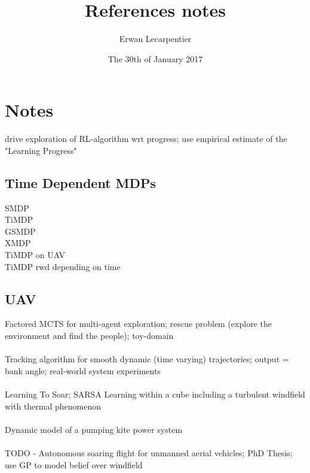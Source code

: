 \documentclass[]{article}
\begin{document}
\title{References notes}
\author{Erwan Lecarpentier}
\date{The 30th of January 2017}


\section*{Notes}

\noindent \cite{lopes2012exploration} drive exploration of RL-algorithm wrt progress; use empirical estimate of the "Learning Progress"

\subsection*{Time Dependent MDPs}
\noindent \cite{sutton1999between} SMDP\\
\noindent \cite{boyan2000exact} TiMDP\\
\noindent \cite{younes2004solving} GSMDP\\
\noindent \cite{rachelson2008extending} XMDP\\
\noindent \cite{rachelson2009adapting} TiMDP on UAV\\
\noindent \cite{bastostime} TiMDP rwd depending on time

\subsection*{UAV}
\noindent \cite{baker2016factored} Factored MCTS for multi-agent exploration; rescue problem (explore the environment and find the people); toy-domain\\\\
\noindent \cite{de2016guidance} Tracking algorithm for smooth dynamic (time varying) trajectories; output = bank angle; real-world system experiments\\\\
\noindent \cite{reddy2016learning} Learning To Soar; SARSA Learning within a cube including a turbulent windfield with thermal phenomenon\\\\
\noindent \cite{fechner2015dynamic} Dynamic model of a pumping kite power system\\\\
\noindent \cite{lawrance2011autonomous} TODO - Autonomous soaring flight for unmanned aerial vehicles; PhD Thesis; use GP to model belief over windfield
\end{document}
